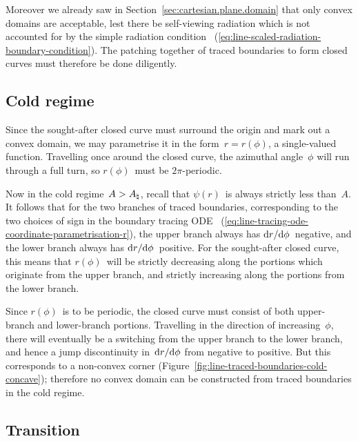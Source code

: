 Moreover we already saw in Section~\ref{sec:cartesian.plane.domain}
that only convex domains are acceptable,
lest there be self-viewing radiation which is not accounted for
by the simple radiation condition~%
  (\ref{eq:line-scaled-radiation-boundary-condition}).
The patching together of traced boundaries to form closed curves
must therefore be done diligently.

\subsection{Cold regime}
\label{sec:polar.tracing.cold}

Since the sought-after closed curve must surround the origin
and mark out a convex domain,
we may parametrise it in the form~$r = r (\phi)$,
a single-valued function.
Travelling once around the closed curve,
the azimuthal angle~$\phi$ will run through a full turn,
so $r (\phi)$~must be $2 \pi$-periodic.

Now in the cold regime~$A > A_\natural$,
recall that $\psi (r)$~is always strictly less than~$A$.
It follows that for the two branches of traced boundaries,
corresponding to the two choices of sign in the boundary tracing ODE~%
  (\ref{eq:line-tracing-ode-coordinate-parametrisation-r}),
the upper branch always has $\mathop{}\!\mathrm{d} r / {\mathop{}\!\mathrm{d}\phi}$~negative,
and the lower branch always has $\mathop{}\!\mathrm{d} r / {\mathop{}\!\mathrm{d}\phi}$~positive.
For the sought-after closed curve,
this means that $r (\phi)$~will be strictly decreasing
along the portions which originate from the upper branch,
and strictly increasing along the portions from the lower branch.

\begin{figure}
\end{figure}

Since $r (\phi)$~is to be periodic,
the closed curve must consist of both
upper-branch and lower-branch portions.
Travelling in the direction of increasing~$\phi$,
there will eventually be a switching
from the upper branch to the lower branch,
and hence a jump discontinuity in~$\mathop{}\!\mathrm{d} r / {\mathop{}\!\mathrm{d}\phi}$
from negative to positive.
But this corresponds to a non-convex corner
(Figure~\ref{fig:line-traced-boundaries-cold-concave});
therefore no convex domain can be constructed from traced boundaries
in the cold regime.

\subsection{Transition}
\label{sec:polar.tracing.transition}

